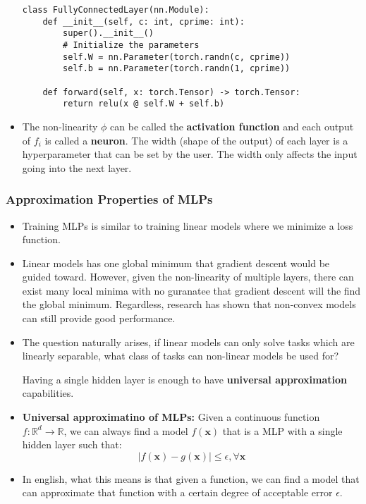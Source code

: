 \documentclass{article}
\newcommand{\tbf}[1]{\textbf{#1}}
\newcommand{\mbf}[1]{\mathbf{#1}}
\begin{document}
\begin{itemize}
\begin{lstlisting}
class FullyConnectedLayer(nn.Module):
    def __init__(self, c: int, cprime: int):
        super().__init__()
        # Initialize the parameters
        self.W = nn.Parameter(torch.randn(c, cprime))
        self.b = nn.Parameter(torch.randn(1, cprime))

    def forward(self, x: torch.Tensor) -> torch.Tensor:
        return relu(x @ self.W + self.b)
            \end{lstlisting}
            
            \item The non-linearity $\phi$ can be called the \tbf{activation function} and each output of $f_i$ is called a \tbf{neuron}. The width (shape of the output) of each layer is a hyperparameter that can be set by the user.
            The width only affects the input going into the next layer.
        \end{itemize}
        \subsubsection{Approximation Properties of MLPs}
        \begin{itemize}
            \item Training MLPs is similar to training linear models where we minimize a loss function.
            \item Linear models has one global minimum that gradient descent would be guided toward. However, given the non-linearity of multiple layers, there can exist 
            many local minima with no guranatee that gradient descent will the find the global minimum. Regardless, research has shown that non-convex models can still provide good performance.
            \item The question naturally arises, if linear models can only solve tasks which are linearly separable, what class of tasks can non-linear models be used for? 
            
            Having a single hidden layer is enough to have \tbf{universal approximation} capabilities.
            \item \tbf{Universal approximatino of MLPs:} Given a continuous function $f : \mathbb{R}^d \rightarrow \mathbb{R}$, we can always find a model $f(\mbf{x})$ that is a MLP with a single hidden layer such that:
            \[|f(\mbf{x}) - g(\mbf{x})| \leq \epsilon, \forall \mbf{x}\]
            \item In english, what this means is that given a function, we can find a model that can approximate that function with a certain degree of acceptable error $\epsilon$. 
        \end{itemize}
\end{document}
